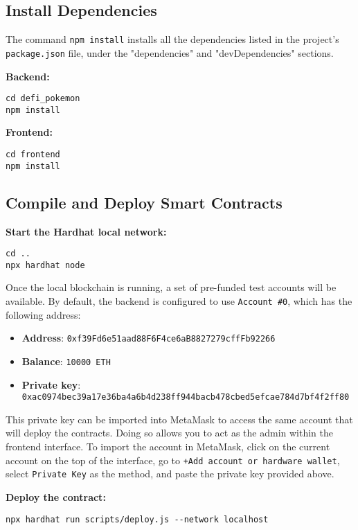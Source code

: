 \documentclass{article}
\begin{document}
\subsection{Install Dependencies}
The command \texttt{npm install} installs all the dependencies listed in the project's \texttt{package.json} file, under the "dependencies" and "devDependencies" sections.

\textbf{Backend:}
\begin{lstlisting}
cd defi_pokemon
npm install
\end{lstlisting}

\textbf{Frontend:}
\begin{lstlisting}
cd frontend
npm install
\end{lstlisting}

\subsection{Compile and Deploy Smart Contracts}
\textbf{Start the Hardhat local network:}
\begin{lstlisting}
cd ..
npx hardhat node
\end{lstlisting}

Once the local blockchain is running, a set of pre-funded test accounts will be available. By default, the backend is configured to use \texttt{Account \#0}, which has the following address:

\begin{itemize}
  \item \textbf{Address}: \texttt{0xf39Fd6e51aad88F6F4ce6aB8827279cffFb92266}
  \item \textbf{Balance}: \texttt{10000 ETH}
  \item \textbf{Private key}: \texttt{0xac0974bec39a17e36ba4a6b4d238ff944bacb478cbed5efcae784d7bf4f2ff80}
\end{itemize}

This private key can be imported into MetaMask to access the same account that will deploy the contracts. Doing so allows you to act as the admin within the frontend interface. To import the account in MetaMask, click on the current account on the top of the interface, go to \texttt{+Add account or hardware wallet}, select \texttt{Private Key} as the method, and paste the private key provided above.

\textbf{Deploy the contract:}
\begin{lstlisting}
npx hardhat run scripts/deploy.js --network localhost
\end{lstlisting}
\end{document}
